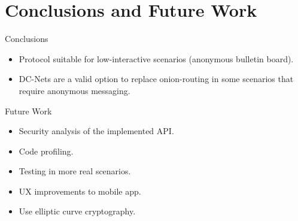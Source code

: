 \section{Conclusions and Future Work}

\begin{frame}{Conclusions}
    \begin{itemize}
        \item Protocol suitable for low-interactive scenarios (anonymous bulletin board).
        \item DC-Nets are a valid option to replace onion-routing in some scenarios that require anonymous messaging.
    \end{itemize}
\end{frame}

\begin{frame}{Future Work}
    \begin{itemize}
        \item Security analysis of the implemented API.
        \item Code profiling.
        \item Testing in more real scenarios.
        \item UX improvements to mobile app.
        \item Use elliptic curve cryptography.
    \end{itemize}
\end{frame}